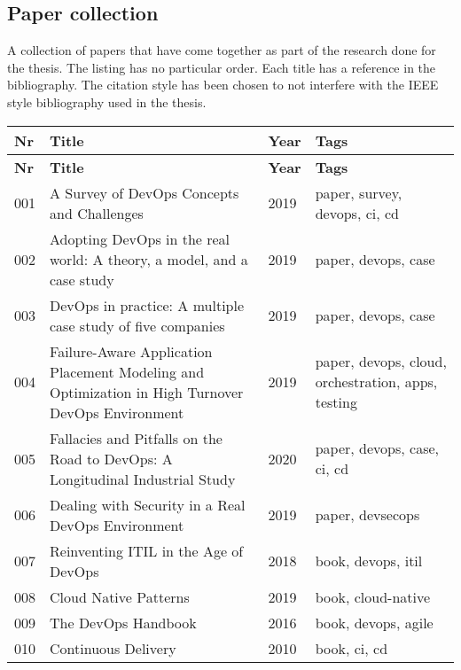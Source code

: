 \documentclass[11pt,a4paper]{article}
\begin{document}
    \subsection*{Paper collection}

    A collection of papers that have come together as part of the research done for the thesis.
    The listing has no particular order.
    Each title has a reference in the bibliography.
    The citation style has been chosen to not interfere with the IEEE style bibliography used in the thesis.
    \\

    \begin{longtable}{L{0.6cm}L{7.5cm}L{0.9cm}L{4cm}}
        \toprule \midrule \textbf{Nr} & \textbf{Title} & \textbf{Year} & \textbf{Tags} \\ \midrule \endfirsthead
        \toprule \textbf{Nr} & \textbf{Title} & \textbf{Year} & \textbf{Tags} \\ \midrule {} & A Survey of DevOps Concepts and Challenges\cite{coll:001} & 2019 & paper, survey, devops, ci, cd \\  & Adopting DevOps in the real world: A theory, a model, and a case study\cite{coll:002} & 2019 & paper, devops, case \\  & DevOps in practice: A multiple case study of five companies\cite{coll:003} & 2019 & paper, devops, case \\  & Failure-Aware Application Placement Modeling and Optimization in High Turnover DevOps Environment\cite{coll:004} & 2019 & paper, devops, cloud, orchestration, apps, testing \\  & Fallacies and Pitfalls on the Road to DevOps: A Longitudinal Industrial Study\cite{coll:005} & 2020 & paper, devops, case, ci, cd \\  & Dealing with Security in a Real DevOps Environment\cite{coll:006} & 2019 & paper, devsecops \\  & Reinventing ITIL in the Age of DevOps\cite{coll:007} & 2018 & book, devops, itil \\  & Cloud Native Patterns\cite{coll:008} & 2019 & book, cloud-native \\  & The DevOps Handbook\cite{coll:009} & 2016 & book, devops, agile \\  & Continuous Delivery\cite{coll:010} & 2010 & book, ci, cd \\ \midrule

\end{longtable}
\end{document}
